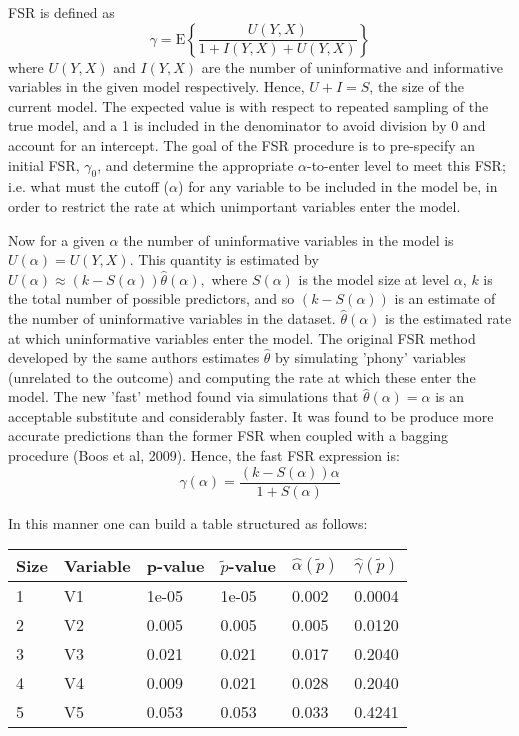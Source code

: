 \documentclass[12pt]{article}
\begin{document}
FSR is defined as
$$ \gamma = \mathrm{E}\left\{\frac{U(Y,X)}{1 + I(Y,X) + U(Y,X)}\right\} $$
where $U(Y,X)$ and $I(Y,X)$ are the number of uninformative and informative variables in the given model respectively.  Hence, 
$U + I = S$, the size of the current model.  The expected value is with respect to repeated sampling of the true model, and a 1 
is included in the denominator to avoid division by 0 and account for an intercept.  The goal of the FSR procedure is to 
pre-specify an initial FSR, $\gamma_0$, and determine the appropriate $\alpha$-to-enter level to meet this FSR; i.e. what must 
the cutoff ($\alpha$) for any variable to be included in the model be, in order to restrict the rate at which unimportant 
variables enter the model.

Now for a given $\alpha$ the number of uninformative variables in the model is $U(\alpha) = U(Y,X)$.  This quantity is estimated
by $U(\alpha) \approx (k - S(\alpha)) \hat{\theta}(\alpha),$ where $S(\alpha)$ is the model size at level $\alpha$, $k$ is the 
total number of possible predictors, and so $(k - S(\alpha))$ is an estimate of the number of uninformative variables in the 
dataset.  $\hat{\theta}(\alpha)$ is the estimated rate at which uninformative variables enter the model.  The original FSR 
method developed by the same authors estimates $\hat{\theta}$ by simulating 'phony' variables (unrelated to the outcome) and 
computing the rate at which these enter the model.  The new 'fast' method found via simulations that $\hat{\theta}(\alpha) = 
\alpha$ is an acceptable substitute and considerably faster.  It was found to be produce more accurate predictions than the 
former FSR when coupled with a bagging procedure (Boos et al, 2009).  Hence, the fast FSR expression is:
$$ \hat{\gamma}(\alpha) = \frac{(k - S(\alpha))\alpha}{1+S(\alpha)} $$

In this manner one can build a table structured as follows:
\begin{center}
\begin{tabular}{l|l|l|l|l|l}
	\hline
	Size & Variable & p-value & $\tilde{p}$-value & $\hat{\alpha}(\tilde{p})$ & $\hat{\gamma}(\tilde{p})$ \\
	\hline
	1 & V1 & 1e-05 & 1e-05 & 0.002 & 0.0004 \\
	2 & V2 & 0.005 & 0.005 & 0.005 & 0.0120 \\
	3 & V3 & 0.021 & 0.021 & 0.017 & 0.2040 \\
	4 & V4 & 0.009 & 0.021 & 0.028 & 0.2040 \\
	5 & V5 & 0.053 & 0.053 & 0.033 & 0.4241 \\
	\hline
\end{tabular}
\end{center}
\end{document}
